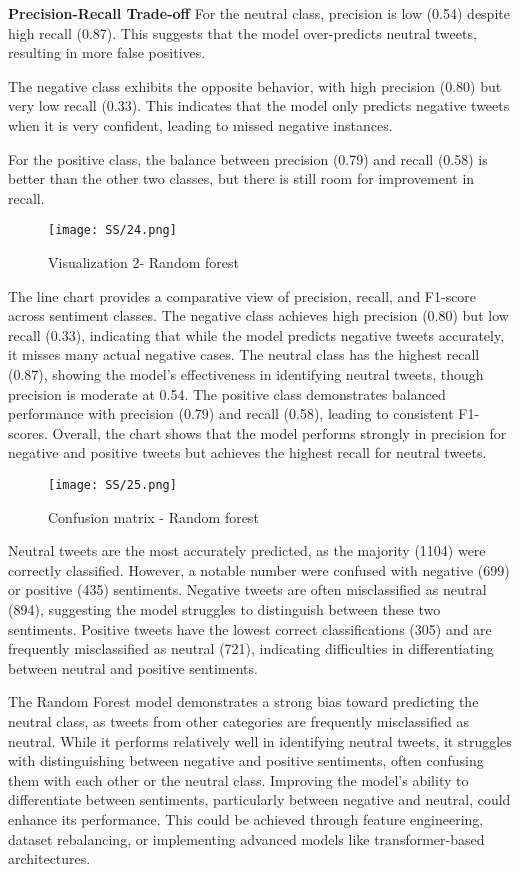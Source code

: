\documentclass[journal]{IEEEtran}
\begin{document}
\textbf{Precision-Recall Trade-off}
For the neutral class, precision is low (0.54) despite high recall (0.87). This suggests that the model over-predicts neutral tweets, resulting in more false positives.

The negative class exhibits the opposite behavior, with high precision (0.80) but very low recall (0.33). This indicates that the model only predicts negative tweets when it is very confident, leading to missed negative instances.

For the positive class, the balance between precision (0.79) and recall (0.58) is better than the other two classes, but there is still room for improvement in recall.

\begin{figure}[H]
\centering
\texttt{[image: SS/24.png]}
\caption{Visualization 2- Random forest}
\end{figure}

The line chart provides a comparative view of precision, recall, and F1-score across sentiment classes. The negative class achieves high precision (0.80) but low recall (0.33), indicating that while the model predicts negative tweets accurately, it misses many actual negative cases. The neutral class has the highest recall (0.87), showing the model’s effectiveness in identifying neutral tweets, though precision is moderate at 0.54. The positive class demonstrates balanced performance with precision (0.79) and recall (0.58), leading to consistent F1-scores. Overall, the chart shows that the model performs strongly in precision for negative and positive tweets but achieves the highest recall for neutral tweets.
\begin{figure}[H]
\centering
\texttt{[image: SS/25.png]}
\caption{Confusion matrix - Random forest}
\end{figure}
Neutral tweets are the most accurately predicted, as the majority (1104) were correctly classified. However, a notable number were confused with negative (699) or positive (435) sentiments. Negative tweets are often misclassified as neutral (894), suggesting the model struggles to distinguish between these two sentiments. Positive tweets have the lowest correct classifications (305) and are frequently misclassified as neutral (721), indicating difficulties in differentiating between neutral and positive sentiments.

The Random Forest model demonstrates a strong bias toward predicting the neutral class, as tweets from other categories are frequently misclassified as neutral. While it performs relatively well in identifying neutral tweets, it struggles with distinguishing between negative and positive sentiments, often confusing them with each other or the neutral class. Improving the model's ability to differentiate between sentiments, particularly between negative and neutral, could enhance its performance. This could be achieved through feature engineering, dataset rebalancing, or implementing advanced models like transformer-based architectures.
\end{document}
